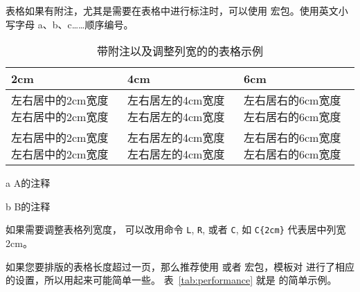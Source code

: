 表格如果有附注，尤其是需要在表格中进行标注时，可以使用  宏包。使用英文小写字母 a、b、c……顺序编号。

\begin{table}
  \centering
  \begin{threeparttable}[c]
    \caption{带附注以及调整列宽的的表格示例}
    \label{tab:three-part-table}
  \begin{tabular}{C{2cm} L{4cm} R{6cm}}
    \toprule
    2cm          & 4cm & 6cm                         \\
    \midrule
    左右居中的2cm宽度左右居中的2cm宽度   & 左右居左的4cm宽度左右居左的4cm宽度 & 左右居右的6cm宽度左右居右的6cm宽度\\
    左右居中的2cm宽度左右居中的2cm宽度   & 左右居左的4cm宽度左右居左的4cm宽度 & 左右居右的6cm宽度左右居右的6cm宽度\\
    \bottomrule
  \end{tabular}
    \begin{tablenotes}
      \item [a] A的注释
      \item [b] B的注释
    \end{tablenotes}
  \end{threeparttable}
\end{table}
如果需要调整表格列宽度， 可以改用命令 \verb|L|, \verb|R|, 或者 \verb|C|, 如 \verb|C{2cm}| 代表居中列宽2cm。


如果您要排版的表格长度超过一页，那么推荐使用  或者 
宏包，模板对  进行了相应的设置，所以用起来可能简单一些。
表~\ref{tab:performance} 就是  的简单示例。

